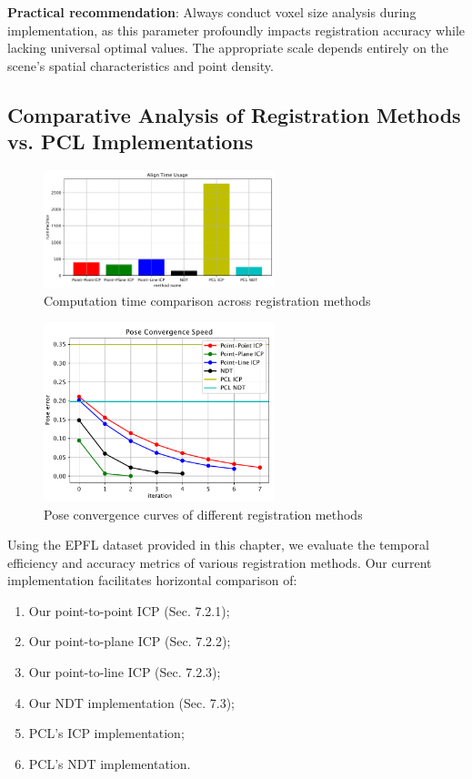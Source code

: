 \textbf{Practical recommendation}: Always conduct voxel size analysis during implementation, as this parameter profoundly impacts registration accuracy while lacking universal optimal values. The appropriate scale depends entirely on the scene's spatial characteristics and point density.

\subsection{Comparative Analysis of Registration Methods vs. PCL Implementations}
\begin{figure}[!t]
	\centering
	\includegraphics[width=0.6\textwidth]{resources/3d-lidar-mapping/align_time_usage.pdf}
	\caption{Computation time comparison across registration methods}
	\label{fig:align-time-usage}
\end{figure}

\begin{figure}[!t]
	\centering
	\includegraphics[width=0.6\textwidth]{resources/3d-lidar-mapping/pose_conv_speed.pdf}
	\caption{Pose convergence curves of different registration methods}
	\label{fig:pose-conv-speed}
\end{figure}

Using the EPFL dataset provided in this chapter, we evaluate the temporal efficiency and accuracy metrics of various registration methods. Our current implementation facilitates horizontal comparison of:
\begin{enumerate}
	\item Our point-to-point ICP (Sec. 7.2.1);
	\item Our point-to-plane ICP (Sec. 7.2.2); 
	\item Our point-to-line ICP (Sec. 7.2.3);
	\item Our NDT implementation (Sec. 7.3);
	\item PCL's ICP implementation;
	\item PCL's NDT implementation.
\end{enumerate}

